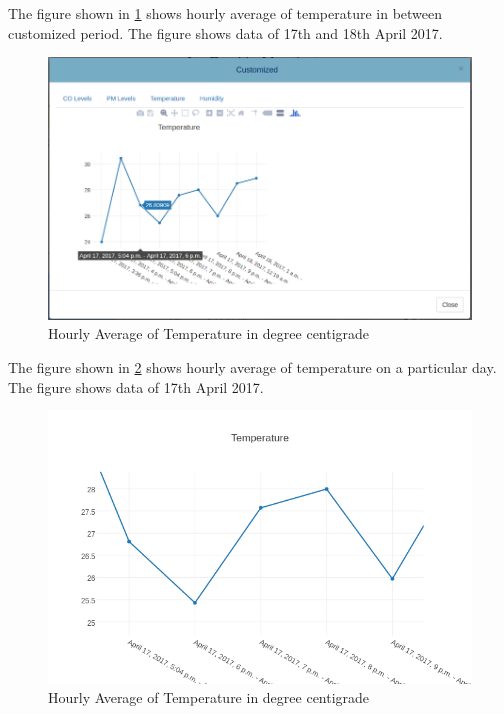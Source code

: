 \documentclass[a4paper,12pt]{article}
\begin{document}
The figure shown in \ref{temp1} shows hourly average of temperature in between customized period. The figure shows data of 17th and 18th April 2017.
\begin{figure}[!ht]
	\centering
	\includegraphics[scale=0.5]{temp1.png}
	\caption{Hourly Average of Temperature in degree centigrade}
	\label{temp1}
\end{figure}
The figure shown in \ref{temperature} shows hourly average of temperature on a particular day. The figure shows data of 17th April 2017.
\begin{figure}[!ht]
	\centering
	\includegraphics[scale=0.5]{temperature.png}
	\caption{Hourly Average of Temperature in degree centigrade}
	\label{temperature}
\end{figure}
\end{document}
